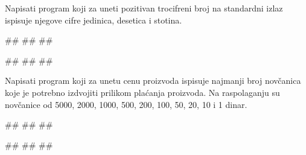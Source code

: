 

\begin{Exercise}[label=v1.1_05] 
Napisati program koji za uneti pozitivan trocifreni broj na standardni izlaz ispisuje njegove cifre jedinica, desetica i stotina. 

\begin{miditest}
\begin{upotreba}{1}
#\naslovInt#
##
##
\end{upotreba}
\end{miditest}
\begin{miditest}
\begin{upotreba}{2}
#\naslovInt#
##
##
\end{upotreba}
\end{miditest}
\end{Exercise}
\begin{Answer}[ref=v1.1_05]
\end{Answer}


\begin{Exercise}[label=v1.1_08] 
Napisati program koji za unetu cenu proizvoda ispisuje najmanji broj novčanica koje je potrebno izdvojiti prilikom plaćanja proizvoda. Na raspolaganju su novčanice od 5000, 2000, 1000, 500, 200, 100, 50, 20, 10 i 1 dinar. 

\begin{maxitest}
\begin{upotreba}{1}
#\naslovInt#
##
##
\end{upotreba}
\begin{upotreba}{2}
#\naslovInt#
##
##
\end{upotreba}
\end{maxitest}
\end{Exercise}
\begin{Answer}[ref=v1.1_08]
\end{Answer}


